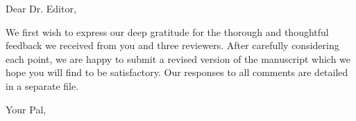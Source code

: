 \documentclass{letter}
\begin{document}
\begin{letter}{
}


\vspace*{-5\baselineskip}

\opening{Dear Dr. Editor,}

We first wish to express our deep gratitude for the thorough and thoughtful feedback we received from you and three reviewers. 
After carefully considering each point, we are happy to submit a revised version of the manuscript which we hope you will find to be satisfactory. 
Our responses to all comments are detailed in a separate file.

\closing{Your Pal,}


\end{letter}
\end{document}

